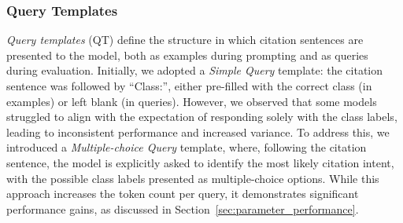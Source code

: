 \subsubsection{Query Templates}\label{sec:query_templates}
\emph{Query templates} (QT) define the structure in which citation sentences are presented to the model, both as examples during prompting and as queries during evaluation. 
Initially, we adopted a \textit{Simple Query} template: 
the citation sentence was followed by ``Class:'', 
either pre-filled with the correct class (in examples) or left blank (in queries). However, we observed that some models struggled to align with the expectation of responding solely with the class labels, leading to inconsistent performance and increased variance.
To address this, we introduced a \textit{Multiple-choice Query} template, where, following the citation sentence, the model is explicitly asked to identify the most likely citation intent, with the possible class labels presented as multiple-choice options. 
While this approach increases the token count per query, it demonstrates significant performance gains, as discussed in Section~\ref{sec:parameter_performance}.


